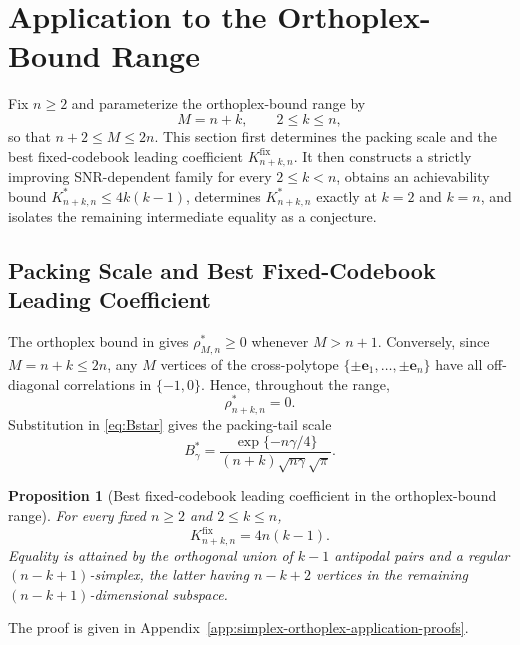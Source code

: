 \documentclass[12pt,draftclsnofoot,onecolumn]{IEEEtran}
\newcommand{\be}{\bm e}
\newtheorem{proposition}{Proposition}
\theoremstyle{definition}
\begin{document}
\section{Application to the Orthoplex-Bound Range}
\label{sec:orthoplex-regime}

Fix \(n\ge2\) and parameterize the orthoplex-bound range by
\begin{equation}
  M=n+k,
  \qquad 2\leq k\leq n,
  \label{eq:orthoplex-range-parameterization}
\end{equation}
so that \(n+2\leq M\leq2n\).  This section first determines the packing
scale and the best fixed-codebook leading coefficient
\(K^{\mathrm{fix}}_{n+k,n}\).
It then constructs a strictly improving SNR-dependent family for every
\(2\leq k<n\), obtains an achievability bound \(K^{\ast}_{n+k,n}\leq 4k(k-1)\), determines \(K^{\ast}_{n+k,n}\) exactly at
\(k=2\) and \(k=n\), and isolates the remaining intermediate equality
as a conjecture.

\subsection{Packing Scale and Best Fixed-Codebook Leading Coefficient}
\label{subsec:orthoplex-fixed-benchmark}

The orthoplex bound in \cite{Rankin1955} gives
\(\rho^{\ast}_{M,n}\ge0\) whenever \(M>n+1\).
Conversely, since \(M=n+k\leq2n\), any \(M\)
vertices of the cross-polytope
\(\{\pm\be_1,\ldots,\pm\be_n\}\) have all off-diagonal correlations
in \(\{-1,0\}\).  Hence, throughout the range,
\begin{equation}
  \rho^{\ast}_{n+k,n}=0.
  \label{eq:orthoplex-range-packing-correlation}
\end{equation}
Substitution in \eqref{eq:Bstar} gives the packing-tail scale
\begin{equation}
  B_\gamma^{\ast}
  =
  \frac{\exp\{-n\gamma/4\}}
  {(n+k)\sqrt{n\gamma}\sqrt{\pi}}.
  \label{eq:orthoplex-range-packing-scale}
\end{equation}

\begin{proposition}[Best fixed-codebook leading coefficient in the orthoplex-bound range]
\label{prop:orthoplex-range-fixed-contact}
For every fixed \(n\ge2\) and \(2\leq k\leq n\),
\begin{equation}
  K^{\mathrm{fix}}_{n+k,n}=4n(k-1).
  \label{eq:orthoplex-range-fixed-contact-count}
\end{equation}
Equality is attained by the orthogonal union of \(k-1\) antipodal pairs
and a regular \((n-k+1)\)-simplex, the latter having \(n-k+2\)
vertices in the remaining \((n-k+1)\)-dimensional subspace.
\end{proposition}
\begin{IEEEproof}
The proof is given in
Appendix~\ref{app:simplex-orthoplex-application-proofs}.
\end{IEEEproof}
\end{document}
